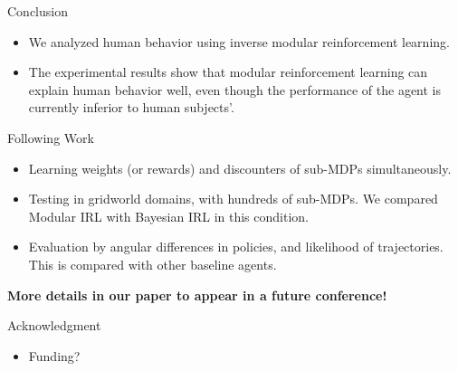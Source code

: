 \documentclass[final]{beamer}
\begin{document}
\begin{frame}{}
\begin{textblock}{39}
\begin{block}{Conclusion}
\begin{itemize}
\item
We analyzed human behavior using inverse modular reinforcement learning.
\item
The experimental results show that modular reinforcement learning can explain
human behavior well, even though the performance of the agent is currently
inferior to human subjects'.
\end{itemize}
\end{block}

\begin{block}{Following Work}
\begin{itemize}
\item
Learning weights (or rewards) and discounters of sub-MDPs simultaneously.
\item
Testing in gridworld domains, with hundreds of sub-MDPs. We compared Modular IRL
with Bayesian IRL in this condition.
\item
Evaluation by angular differences in policies, and likelihood of trajectories.
This is compared with other baseline agents.
\end{itemize}

{\bf More details in our paper to appear in a future conference!}
\end{block}

\begin{block}{Acknowledgment}
\begin{itemize}
\item Funding?
\end{itemize}
\end{block}

\end{textblock}

\end{frame}
\end{document}
